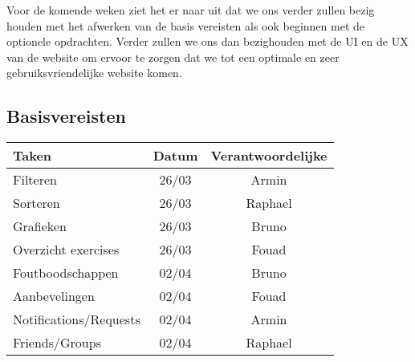 Voor de komende weken ziet het er naar uit dat we ons verder zullen bezig houden met het afwerken van de basis vereisten als ook beginnen met de optionele opdrachten. Verder zullen we ons dan bezighouden met de UI en de UX van de
website om ervoor te zorgen dat we tot een optimale en zeer gebruiksvriendelijke website komen.


\subsection{Basisvereisten}
\begin{tabular}{| l | c | c |}
    \hline
    Taken   &   Datum   &   Verantwoordelijke \\
    \hline \hline
    Filteren    &   26/03   &   Armin   \\
    Sorteren    &   26/03   &   Raphael \\
    Grafieken   &   26/03   &   Bruno   \\
    Overzicht exercises &   26/03   &   Fouad   \\
    Foutboodschappen    &   02/04   &   Bruno   \\
    Aanbevelingen   &   02/04   &   Fouad   \\
    Notifications/Requests  &   02/04   &   Armin   \\
    Friends/Groups  &   02/04   &   Raphael \\
    \hline
\end{tabular}

